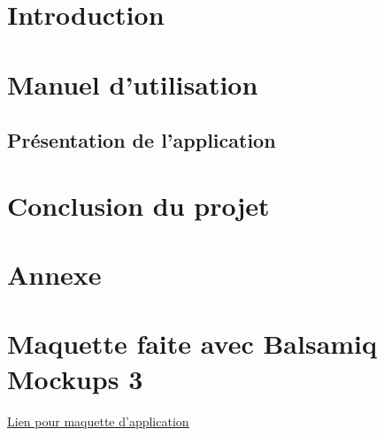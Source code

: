 \documentclass[12pt]{article}
\begin{document}

\tableofcontents
\pagebreak

\newpage
\section{Introduction}


\newpage
\section{Manuel d'utilisation}

\subsection{Présentation de l'application}


\section{Conclusion du projet}
\paragraph{}

\newpage




\newpage
\section{Annexe}
\appendix
\section{Maquette faite avec Balsamiq Mockups 3}
\label{Annexe-Maquette}
\href{https://drive.google.com/file/d/13S1_j926OpUDYI9evYTFl-aJDEXmhMbn/view?usp=sharing}{\underline{Lien pour maquette d'application}}
\end{document}
